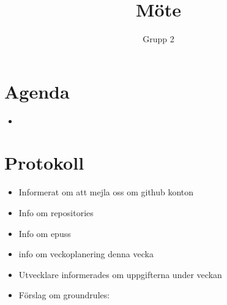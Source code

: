 \documentclass[paper=a4, fontsize=11pt,twoside]{article}
\title{Möte}
\author{Grupp 2}
\date{}
\begin{document}
\maketitle	

\section{Agenda}

\begin{itemize}
  \item 
\end{itemize}

\section{Protokoll}

\begin{itemize}
  \item Informerat om att mejla oss om github konton
  \item Info om repositories
  \item Info om epuss
  \item info om veckoplanering denna vecka
  \item Utvecklare informerades om uppgifterna under veckan
  \item Förslag om groundrules:
\end{itemize}



% 
% 
% 
%     
% 
% 
\end{document}
